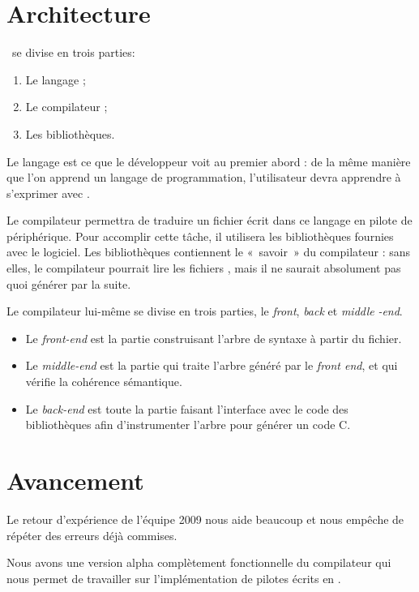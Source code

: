 \documentclass[francais]{rtxreport}
\begin{document}
\section{Architecture}
\rtx\ se divise en trois parties:
\begin{enumerate}
	\item Le langage ;
	\item Le compilateur ;
	\item Les bibliothèques.
\end{enumerate}

Le langage est ce que le développeur voit au premier abord : de la même manière
que l’on apprend un langage de programmation, l’utilisateur devra apprendre à
s’exprimer avec \rtx.

Le compilateur permettra de traduire un fichier écrit dans ce langage en pilote
de périphérique. Pour accomplir cette tâche, il utilisera les bibliothèques
fournies avec le logiciel. Les bibliothèques contiennent le «~savoir~» du
compilateur : sans elles, le compilateur pourrait lire les fichiers \rtx, mais
il ne saurait absolument pas quoi générer par la suite.

Le compilateur lui-même se divise en trois parties, le \emph{front}, \emph{back}
et \emph{middle} \emph{-end}.

\begin{itemize}
	\item Le \emph{front-end} est la partie construisant l’arbre de syntaxe à
          partir du fichier.
	\item Le \emph{middle-end} est la partie qui traite l’arbre généré par
          le \emph{front end}, et qui vérifie la cohérence sémantique.
        \item Le \emph{back-end} est toute la partie faisant l'interface avec le
          code des bibliothèques afin d'instrumenter l'arbre pour générer un code
          C.
\end{itemize}

\section{Avancement}

Le retour d'expérience de l'équipe 2009 nous aide beaucoup et nous empêche de
répéter des erreurs déjà commises.

Nous avons une version alpha complètement fonctionnelle du compilateur qui nous
permet de travailler sur l'implémentation de pilotes écrits en \rtx.
\end{document}
